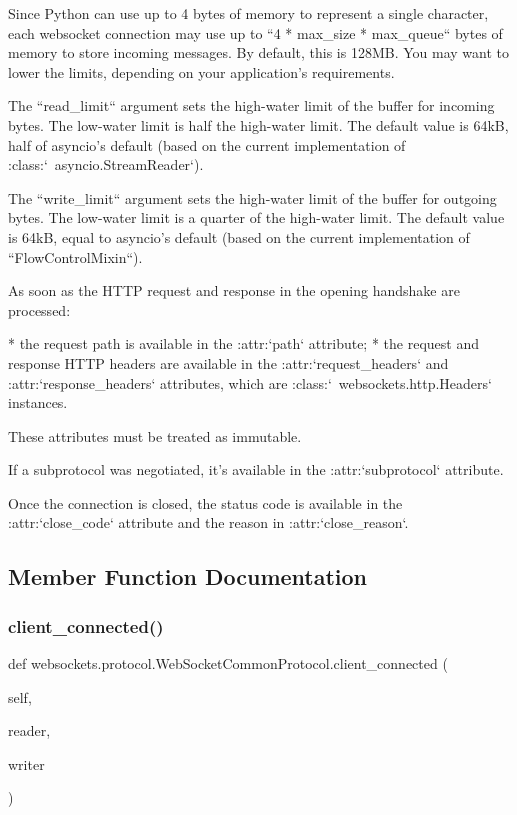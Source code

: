 \begin{DoxyVerb}
Since Python can use up to 4 bytes of memory to represent a single
character, each websocket connection may use up to ``4 * max_size *
max_queue`` bytes of memory to store incoming messages. By default,
this is 128MB. You may want to lower the limits, depending on your
application's requirements.

The ``read_limit`` argument sets the high-water limit of the buffer for
incoming bytes. The low-water limit is half the high-water limit. The
default value is 64kB, half of asyncio's default (based on the current
implementation of :class:`~asyncio.StreamReader`).

The ``write_limit`` argument sets the high-water limit of the buffer for
outgoing bytes. The low-water limit is a quarter of the high-water limit.
The default value is 64kB, equal to asyncio's default (based on the
current implementation of ``FlowControlMixin``).

As soon as the HTTP request and response in the opening handshake are
processed:

* the request path is available in the :attr:`path` attribute;
* the request and response HTTP headers are available in the
  :attr:`request_headers` and :attr:`response_headers` attributes,
  which are :class:`~websockets.http.Headers` instances.

These attributes must be treated as immutable.

If a subprotocol was negotiated, it's available in the :attr:`subprotocol`
attribute.

Once the connection is closed, the status code is available in the
:attr:`close_code` attribute and the reason in :attr:`close_reason`.\end{DoxyVerb}
 

\subsection{Member Function Documentation}
\mbox{\label{classwebsockets_1_1protocol_1_1_web_socket_common_protocol_aefe4c82f5ec19977f55679023ac608fb}} 
\subsubsection{\texorpdfstring{client\+\_\+connected()}{client\_connected()}}
{\footnotesize\ttfamily def websockets.\+protocol.\+Web\+Socket\+Common\+Protocol.\+client\+\_\+connected (\begin{DoxyParamCaption}\item[{}]{self,  }\item[{}]{reader,  }\item[{}]{writer }\end{DoxyParamCaption})}

